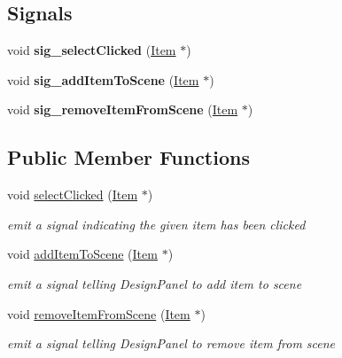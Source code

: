 \subsection*{Signals}
\begin{DoxyCompactItemize}
\item 
void {\bfseries sig\+\_\+select\+Clicked} (\hyperlink{classprim_1_1Item}{Item} $\ast$)\hypertarget{classprim_1_1Emitter_a82a2a380009e179e7b9f7b04d7ffeab8}{}\label{classprim_1_1Emitter_a82a2a380009e179e7b9f7b04d7ffeab8}

\item 
void {\bfseries sig\+\_\+add\+Item\+To\+Scene} (\hyperlink{classprim_1_1Item}{Item} $\ast$)\hypertarget{classprim_1_1Emitter_a8f1dbfa8fd13fd1007c85492f1fc6e90}{}\label{classprim_1_1Emitter_a8f1dbfa8fd13fd1007c85492f1fc6e90}

\item 
void {\bfseries sig\+\_\+remove\+Item\+From\+Scene} (\hyperlink{classprim_1_1Item}{Item} $\ast$)\hypertarget{classprim_1_1Emitter_a4f5d3eb263a7821c97c705937f85f9f6}{}\label{classprim_1_1Emitter_a4f5d3eb263a7821c97c705937f85f9f6}

\end{DoxyCompactItemize}
\subsection*{Public Member Functions}
\begin{DoxyCompactItemize}
\item 
void \hyperlink{classprim_1_1Emitter_a2db5f282e69806d7cc527aa1008e5a51}{select\+Clicked} (\hyperlink{classprim_1_1Item}{Item} $\ast$)\hypertarget{classprim_1_1Emitter_a2db5f282e69806d7cc527aa1008e5a51}{}\label{classprim_1_1Emitter_a2db5f282e69806d7cc527aa1008e5a51}

\begin{DoxyCompactList}\small\item\em emit a signal indicating the given item has been clicked \end{DoxyCompactList}\item 
void \hyperlink{classprim_1_1Emitter_a9be15bb962c444c37cb539de62c1ffef}{add\+Item\+To\+Scene} (\hyperlink{classprim_1_1Item}{Item} $\ast$)\hypertarget{classprim_1_1Emitter_a9be15bb962c444c37cb539de62c1ffef}{}\label{classprim_1_1Emitter_a9be15bb962c444c37cb539de62c1ffef}

\begin{DoxyCompactList}\small\item\em emit a signal telling Design\+Panel to add item to scene \end{DoxyCompactList}\item 
void \hyperlink{classprim_1_1Emitter_a5fc17d7e621739edb04cd7d40e41ab40}{remove\+Item\+From\+Scene} (\hyperlink{classprim_1_1Item}{Item} $\ast$)\hypertarget{classprim_1_1Emitter_a5fc17d7e621739edb04cd7d40e41ab40}{}\label{classprim_1_1Emitter_a5fc17d7e621739edb04cd7d40e41ab40}

\begin{DoxyCompactList}\small\item\em emit a signal telling Design\+Panel to remove item from scene \end{DoxyCompactList}\end{DoxyCompactItemize}
